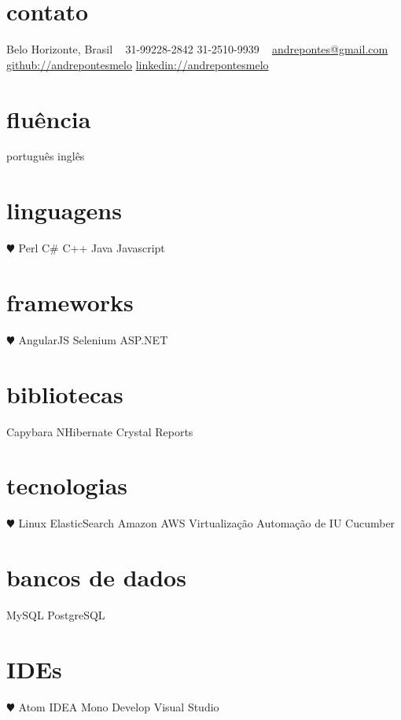 \documentclass[]{friggeri-cv}
\begin{document}


\begin{aside}
\section{contato}
Belo Horizonte, Brasil
~
31-99228-2842
31-2510-9939
~
\href{mailto:andrepontes@gmail.com}{andrepontes@gmail.com}
\href{https://github.com/andrepontesmelo}{github://andrepontesmelo}
\href{https://br.linkedin.com/in/andrepontesmelo}{linkedin://andrepontesmelo}
\section{fluência}
português
inglês
\section{linguagens}
{\color{red} $\varheartsuit$} Perl
C\#
C++
Java
Javascript
\section{frameworks}
 {\color{red} $\varheartsuit$} AngularJS
Selenium
ASP.NET
\section{bibliotecas}
Capybara
NHibernate
Crystal Reports
\section{tecnologias}
 {\color{red} $\varheartsuit$} Linux
ElasticSearch
Amazon AWS
Virtualização
Automação de IU
Cucumber
\section{bancos de dados}
MySQL
PostgreSQL
\section{IDEs}
{\color{red} $\varheartsuit$} Atom
IDEA
Mono Develop
Visual Studio
\end{aside}
\end{document}
